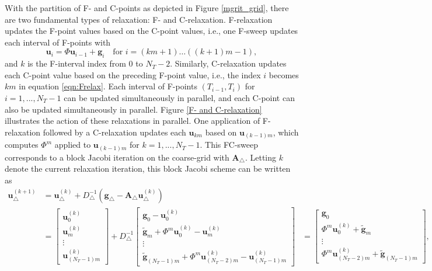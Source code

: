 \documentclass[VANCOUVER,STIX1COL]{WileyNJD-v2}
\makeatletter
\newcommand{\bs}[1]{\textcolor{magenta}{[BS\@: #1]}}
\makeatother
\begin{document}
With the partition of F- and C-points as depicted in Figure \ref{mgrit_grid}, there are two fundamental types of relaxation: F- and C-relaxation. F-relaxation updates the F-point values based on the C-point values, i.e., one F-sweep updates each interval of F-points with 
\begin{equation}
 \mathbf{u}_i = \Phi \mathbf{u}_{i-1} + \mathbf{g}_i \quad \mbox{for } i = (km+1) \dots ((k+1)m-1),
 \label{eqn:Frelax}
 \end{equation}
and $k$ is the F-interval index from $0$ to $N_T-2$.
Similarly, C-relaxation updates each C-point value based on the preceding F-point value, i.e., the index $i$ becomes $km$ in equation \eqref{eqn:Frelax}. Each interval of F-points $(T_{i-1}, T_{i})$ for $i = 1,..., N_T-1$ can be updated simultaneously in parallel, and each C-point can also be updated simultaneously in parallel. Figure \ref{F- and C-relaxation} illustrates the action of these relaxations in parallel.
One application of F-relaxation followed by a C-relaxation updates each $\mathbf{u}_{km}$ based on $\mathbf{u}_{(k-1)m}$, which computes $\Phi^m$ applied to $\mathbf{u}_{(k-1)m}$ for $k = 1,..., N_T-1$. This FC-sweep corresponds to a block Jacobi iteration on the coarse-grid with $\mathbf{A}_{\triangle}$. Letting $k$ denote the current relaxation iteration, this block Jacobi scheme can be written as
\begin{equation} \label{block jacobi F- and C- relaxation}
\begin{aligned}
{\mathbf{u}_{\triangle}^{(k + 1)}} & {= \mathbf{u}^{(k)}_{\triangle} + D_\triangle^{-1} (\mathbf{g}_{\triangle} - \mathbf{A}_{\triangle} \mathbf{u}^{(k)}_{\triangle})} \\
&= \begin{bmatrix} \mathbf{u}_0^{(k)}\\ \mathbf{u}_m^{(k)} 
\\ \vdots \\ \mathbf{u}_{(N_T-1) m}^{(k)} \end{bmatrix} + D_\triangle^{-1} 
\begin{bmatrix}
\mathbf{g}_0 - \mathbf{u}_0^{(k)} \\ \tilde{\mathbf{g}}_m + \Phi^m \mathbf{u}_0^{(k)} - \mathbf{u}_m^{(k)} \\ \vdots \\ \tilde{\mathbf{g}}_{(N_T-1) m} + \Phi^m \mathbf{u}_{(N_T - 2)m}^{(k)} - \mathbf{u}_{(N_T-1) m}^{(k)}
\end{bmatrix}
&= \begin{bmatrix} \mathbf{g}_0 \\ \Phi^m \mathbf{u}_0^{(k)} + \tilde{\mathbf{g}}_m \\ \vdots \\ \Phi^m \mathbf{u}_{(N_T - 2)m}^{(k)} + \tilde{\mathbf{g}}_{(N_T-1) m}\end{bmatrix},
\end{aligned}
\end{equation}
\end{document}
